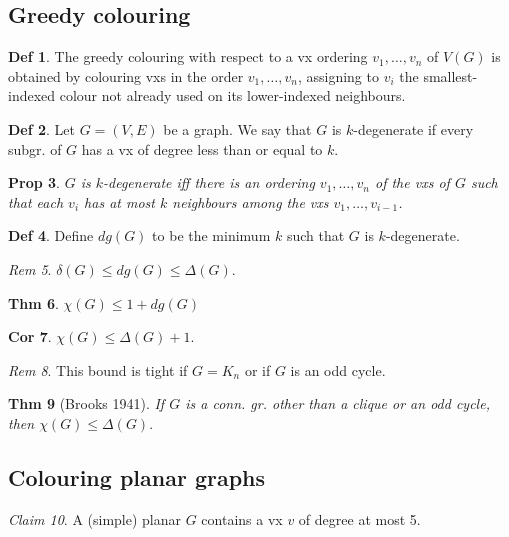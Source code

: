\documentclass[11pt, fleqn, a4paper, landscape]{article}
\theoremstyle{plain} %
\newtheorem{thm}{Thm}
\newtheorem{pro}[thm]{Prop}
\newtheorem{cor}[thm]{Cor}
\theoremstyle{remark} %
\newtheorem{rem}[thm]{Rem}
\newtheorem{claim}[thm]{Claim}
\theoremstyle{definition} %
\newtheorem{defi}[thm]{Def}
\begin{document}
\begin{multicols}{5}
\subsection{Greedy colouring}

\begin{defi}
The greedy colouring with respect to a vx ordering $v_1, \dots , v_n$ of $V (G)$ is obtained by colouring vxs in the order $v_1, \dots , v_n$, assigning to $v_i$ the smallest-indexed colour not already used on its lower-indexed neighbours.
\end{defi}
\addtocounter{thm}{1}
\begin{defi}
Let $G = (V,E)$ be a graph. We say that $G$ is $k$-degenerate if every subgr. of $G$ has a vx of degree less than or equal to $k$.
\end{defi}

\begin{pro}
$G$ is $k$-degenerate iff there is an ordering $v_1, \dots , v_n$ of the vxs of $G$ such that each $v_i$ has at most $k$ neighbours among the vxs $v_1, \dots , v_{i-1}$.
\end{pro}

\begin{defi}
Define $dg(G)$ to be the minimum $k$ such that $G$ is $k$-degenerate.
\end{defi}
\begin{rem}
$\delta(G) \le dg(G) \le \Delta(G)$.
\end{rem}

\begin{thm}
$\chi(G) \le 1 + dg(G)$
\end{thm}

\begin{cor}
$\chi(G) \le \Delta(G) + 1.$
\end{cor}

\begin{rem}
This bound is tight if $G = K_n$ or if $G$ is an odd cycle.
\end{rem}

\begin{thm}[Brooks 1941]
If $G$ is a conn. gr. other than a clique or an odd cycle, then
$\chi(G) \le \Delta(G).$
\end{thm}

\subsection{Colouring planar graphs}
\begin{claim}
A (simple) planar $G$ contains a vx $v$ of degree at most 5.
\end{claim}


\end{multicols}
\end{document}
